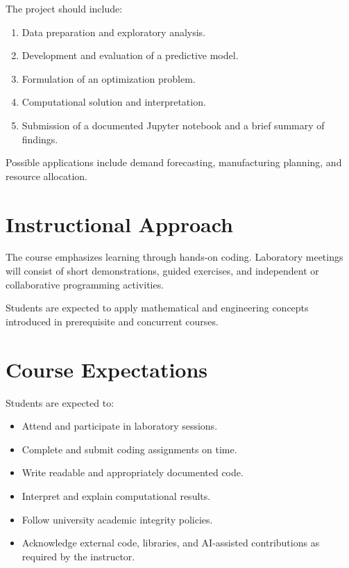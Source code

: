 \documentclass[11pt]{article}
\begin{document}
The project should include:

\begin{enumerate}[nosep]
    \item Data preparation and exploratory analysis.
    \item Development and evaluation of a predictive model.
    \item Formulation of an optimization problem.
    \item Computational solution and interpretation.
    \item Submission of a documented Jupyter notebook
    and a brief summary of findings.
\end{enumerate}

Possible applications include demand forecasting,
manufacturing planning, and resource allocation.

\section*{Instructional Approach}

The course emphasizes learning through hands-on coding.
Laboratory meetings will consist of short demonstrations,
guided exercises, and independent or collaborative
programming activities.

Students are expected to apply mathematical and engineering
concepts introduced in prerequisite and concurrent courses.

\section*{Course Expectations}

Students are expected to:

\begin{itemize}[leftmargin=*,nosep]
    \item Attend and participate in laboratory sessions.
    \item Complete and submit coding assignments on time.
    \item Write readable and appropriately documented code.
    \item Interpret and explain computational results.
    \item Follow university academic integrity policies.
    \item Acknowledge external code, libraries, and
    AI-assisted contributions as required by the instructor.
\end{itemize}
\end{document}
